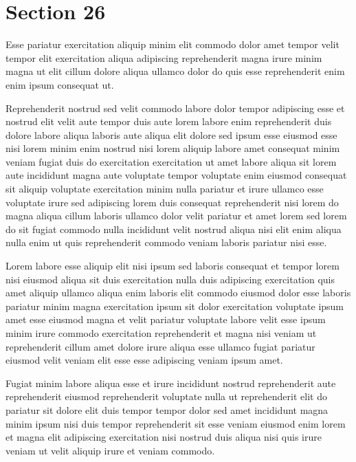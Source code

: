 \documentclass{article}
\begin{document}
\section{Section 26}
Esse pariatur exercitation aliquip minim elit commodo dolor amet tempor velit tempor elit exercitation aliqua adipiscing reprehenderit magna irure minim magna ut elit cillum dolore aliqua ullamco dolor do quis esse reprehenderit enim enim ipsum consequat ut.

Reprehenderit nostrud sed velit commodo labore dolor tempor adipiscing esse et nostrud elit velit aute tempor duis aute lorem labore enim reprehenderit duis dolore labore aliqua laboris aute aliqua elit dolore sed ipsum esse eiusmod esse nisi lorem minim enim nostrud nisi lorem aliquip labore amet consequat minim veniam fugiat duis do exercitation exercitation ut amet labore aliqua sit lorem aute incididunt magna aute voluptate tempor voluptate enim eiusmod consequat sit aliquip voluptate exercitation minim nulla pariatur et irure ullamco esse voluptate irure sed adipiscing lorem duis consequat reprehenderit nisi lorem do magna aliqua cillum laboris ullamco dolor velit pariatur et amet lorem sed lorem do sit fugiat commodo nulla incididunt velit nostrud aliqua nisi elit enim aliqua nulla enim ut quis reprehenderit commodo veniam laboris pariatur nisi esse.

Lorem labore esse aliquip elit nisi ipsum sed laboris consequat et tempor lorem nisi eiusmod aliqua sit duis exercitation nulla duis adipiscing exercitation quis amet aliquip ullamco aliqua enim laboris elit commodo eiusmod dolor esse laboris pariatur minim magna exercitation ipsum sit dolor exercitation voluptate ipsum amet esse eiusmod magna et velit pariatur voluptate labore velit esse ipsum minim irure commodo exercitation reprehenderit et magna nisi veniam ut reprehenderit cillum amet dolore irure aliqua esse ullamco fugiat pariatur eiusmod velit veniam elit esse esse adipiscing veniam ipsum amet.

Fugiat minim labore aliqua esse et irure incididunt nostrud reprehenderit aute reprehenderit eiusmod reprehenderit voluptate nulla ut reprehenderit elit do pariatur sit dolore elit duis tempor tempor dolor sed amet incididunt magna minim ipsum nisi duis tempor reprehenderit sit esse veniam eiusmod enim lorem et magna elit adipiscing exercitation nisi nostrud duis aliqua nisi quis irure veniam ut velit aliquip irure et veniam commodo.
\end{document}
